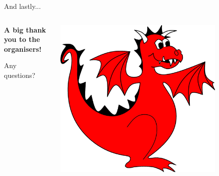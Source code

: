 \documentclass[pdf,aspectratio=169]{beamer}
\begin{document}
\begin{frame}{And lastly...}
  \begin{columns}[T]
    \begin{column}{0.45\textwidth}
      \begin{center}
	\vspace{3.5em}

	\textbf{A big thank you to the organisers!}

	\vspace{2em}

	Any questions?
      \end{center}
    \end{column}
    \begin{column}[T]{0.45\textwidth}
      \includegraphics[width=0.8\textwidth]{firedrake}
    \end{column}
  \end{columns}
\end{frame}
\end{document}
